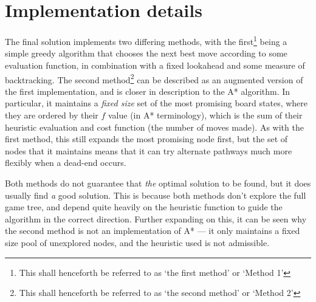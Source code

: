 \documentclass[a4paper, 11pt, titlepage]{report}
\begin{document}
\chapter{Implementation details}
The final solution implements two differing methods, with the first\footnote{This shall henceforth be referred to as `the first method' or `Method 1'} being a simple greedy algorithm that chooses the next best move according to some evaluation function, in combination with a fixed lookahead and some measure of backtracking. The second method\footnote{This shall henceforth be referred to as `the second method' or `Method 2'} can be described as an augmented version of the first implementation, and is closer in description to the A* algorithm. In particular, it maintains a \emph{fixed size} set of the most promising board states, where they are ordered by their $f$ value (in A* terminology), which is the sum of their heuristic evaluation and cost function (the number of moves made). As with the first method, this still expands the most promising node first, but the set of nodes that it maintains means that it can try alternate pathways much more flexibly when a dead-end occurs.

Both methods do not guarantee that \emph{the} optimal solution to be found, but it does usually find \emph{a} good solution. This is because both methods don't explore the full game tree, and depend quite heavily on the heuristic function to guide the algorithm in the correct direction. Further expanding on this, it can be seen why the second method is not an implementation of A* --- it only maintains a fixed size pool of unexplored nodes, and the heuristic used is not admissible.
\end{document}
